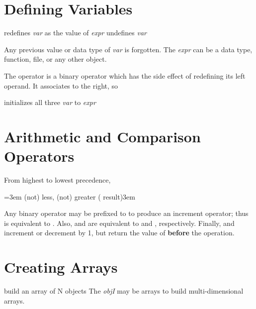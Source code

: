 \section{Defining Variables}

       {redefines {\it var\/} as the value of {\it expr}}
       {undefines {\it var}}

Any previous value or data type of {\it var} is forgotten.
The {\it expr\/} can be a data type, function, file, or any other object.

The \kbd{=} operator is a binary operator which has the side effect of
redefining its left operand.  It associates to the right, so

       {initializes all three {\it var\/} to {\it expr}}

\section{Arithmetic and Comparison Operators}

From highest to lowest precedence, 

\keyindent=3em
\func{>= < <= >}
     {(not) less, (not) greater ( result)\hglue3em}
\endindentedkeys

Any binary operator may be prefixed to \kbd{=} to produce an increment
operator; thus  is equivalent to .  Also, 
and  are equivalent to  and , respectively.
Finally,  and  increment or decrement  by 1, but
return the value of  {\bf before} the operation.

\section{Creating Arrays}

       {build an array of N objects}
The {\it objI} may be arrays to build multi-dimensional arrays.

